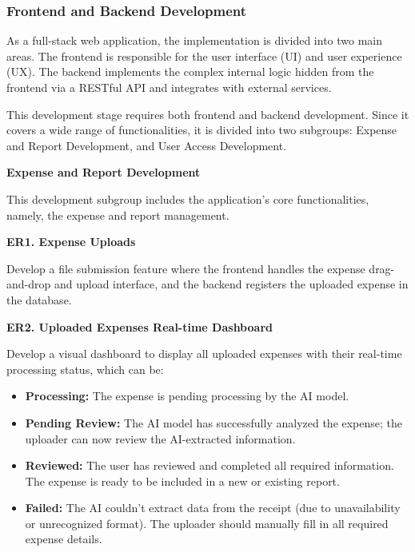 \subsubsection{Frontend and Backend Development}

As a full-stack web application, the implementation is divided into two main areas. The frontend is responsible for the user interface (UI) and user experience (UX). The backend implements the complex internal logic hidden from the frontend via a RESTful API and integrates with external services. 

This development stage requires both frontend and backend development. Since it covers a wide range of functionalities, it is divided into two subgroups: Expense and Report Development, and User Access Development.

\textbf{Expense and Report Development}

This development subgroup includes the application's core functionalities, namely, the expense and report management.

\vspace{1cm}

\textbf{ER1. Expense Uploads}

Develop a file submission feature where the frontend handles the expense drag-and-drop and upload interface, and the backend registers the uploaded expense in the database.

\textbf{ER2. Uploaded Expenses Real-time Dashboard}

Develop a visual dashboard to display all uploaded expenses with their real-time processing status, which can be:

\begin{itemize}[leftmargin=0.75cm,noitemsep, label=\textbullet]
    \item \textbf{Processing:} The expense is pending processing by the AI model.

    \item \textbf{Pending Review:} The AI model has successfully analyzed the expense; the uploader can now review the AI-extracted information.

    \item \textbf{Reviewed:} The user has reviewed and completed all required information. The expense is ready to be included in a new or existing report.

    \item \textbf{Failed:} The AI couldn't extract data from the receipt (due to unavailability or unrecognized format). The uploader should manually fill in all required expense details.

\end{itemize}

